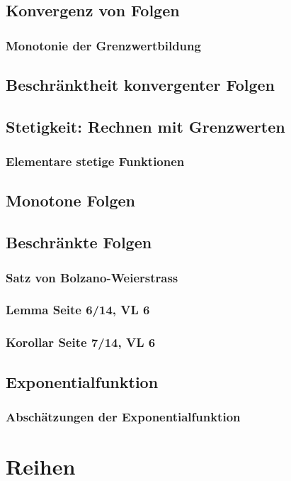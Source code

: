 \documentclass[10pt,a4paper^, twocolumn]{article}
\begin{document}
\subsection{Konvergenz von Folgen}
\subsubsection{Monotonie der Grenzwertbildung}
\subsection{Beschränktheit konvergenter Folgen}
\subsection{Stetigkeit: Rechnen mit Grenzwerten}
\subsubsection{Elementare stetige Funktionen}
\subsection{Monotone Folgen}
\subsection{Beschränkte Folgen}
\subsubsection{Satz von Bolzano-Weierstrass}
\subsubsection{Lemma Seite 6/14, VL 6}
\subsubsection{Korollar Seite 7/14, VL 6}
\subsection{Exponentialfunktion}
\subsubsection{Abschätzungen der Exponentialfunktion}

\section{Reihen}
\end{document}
